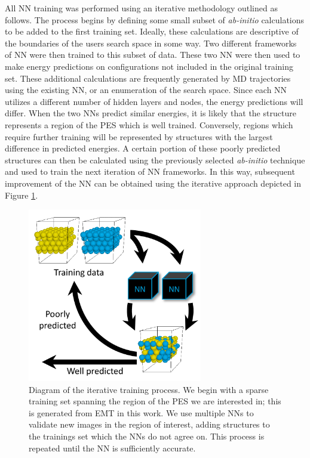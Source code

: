 \documentclass[12pt,oneside]{cmuthesis}
\begin{document}
All NN training was performed using an iterative methodology outlined as follows. The process begins by defining some small subset of \emph{ab-initio} calculations to be added to the first training set. Ideally, these calculations are descriptive of the boundaries of the users search space in some way. Two different frameworks of NN were then trained to this subset of data. These two NN were then used to make energy predictions on configurations not included in the original training set. These additional calculations are frequently generated by MD trajectories using the existing NN, or an enumeration of the search space. Since each NN utilizes a different number of hidden layers and nodes, the energy predictions will differ. When the two NNs predict similar energies, it is likely that the structure represents a region of the PES which is well trained. Conversely, regions which require further training will be represented by structures with the largest difference in predicted energies. A certain portion of these poorly predicted structures can then be calculated using the previously selected \emph{ab-initio} technique and used to train the next iteration of NN frameworks. In this way, subsequent improvement of the NN can be obtained using the iterative approach depicted in Figure \ref{fig-training-process}.

\begin{figure}[h]
\centering
\includegraphics[width=3in]{./images/training-process.png}
\caption{\label{fig-training-process}
Diagram of the iterative training process. We begin with a sparse training set spanning the region of the PES we are interested in; this is generated from EMT in this work. We use multiple NNs to validate new images in the region of interest, adding structures to the trainings set which the NNs do not agree on. This process is repeated until the NN is sufficiently accurate.}
\end{figure}
\end{document}

